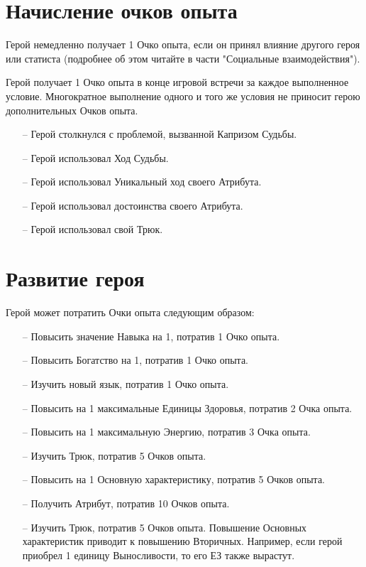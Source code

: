 \section{Начисление очков опыта}
Герой немедленно получает 1 Очко опыта, если он принял влияние другого героя или статиста (подробнее об этом читайте в части "Социальные взаимодействия").

Герой получает 1 Очко опыта в конце игровой встречи за каждое
выполненное условие. Многократное выполнение одного и того же
условия не приносит герою дополнительных Очков опыта.
\begin{itemize}
\item[--] Герой столкнулся с проблемой, вызванной Капризом Судьбы.
\item[--] Герой использовал Ход Судьбы.
\item[--] Герой использовал Уникальный ход своего Атрибута.
\item[--] Герой использовал достоинства своего Атрибута.
\item[--] Герой использовал свой Трюк.
\end{itemize}
%

\section{Развитие героя}
Герой может потратить Очки опыта следующим образом:
\begin{itemize}
\item[--] Повысить значение Навыка на 1, потратив 1 Очко опыта.
\item[--] Повысить Богатство на 1, потратив 1 Очко опыта.
\item[--] Изучить новый язык, потратив 1 Очко опыта.
\item[--] Повысить на 1 максимальные Единицы Здоровья, потратив 2 Очка опыта.
\item[--] Повысить на 1 максимальную Энергию, потратив 3 Очка опыта.
\item[--] Изучить Трюк, потратив 5 Очков опыта.
\item[--] Повысить на 1 Основную характеристику, потратив 5 Очков опыта.
\item[--] Получить Атрибут, потратив 10 Очков опыта.
\item[--] Изучить Трюк, потратив 5 Очков опыта.
Повышение Основных характеристик приводит к повышению Вторичных. Например, если герой приобрел 1 единицу Выносливости, то его ЕЗ также вырастут.
\end{itemize}

